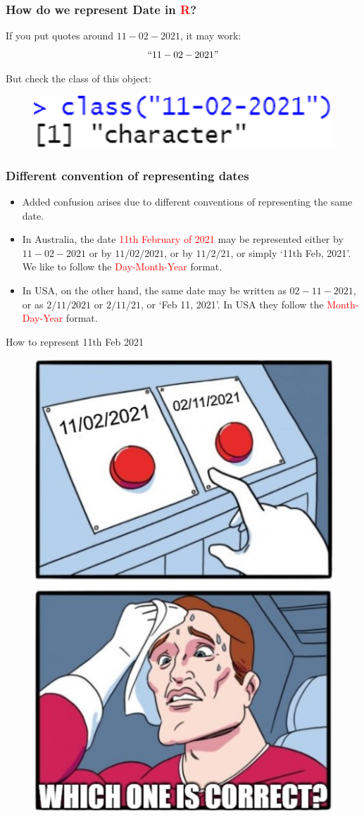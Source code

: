 \documentclass{beamer}
\begin{document}
\begin{frame}\frametitle{How do we represent Date in \textcolor{red}{\textsf{R}}?}
If you put quotes around $11-02-2021$, it may work: $$``11-02-2021"$$

But check the class of this object:
\begin{figure}
\includegraphics[width=0.70\linewidth]{PlotsLec4/DateAsChar}
\end{figure}
\end{frame}

\begin{frame}\frametitle{Different convention of representing dates}
\begin{itemize}
\item Added confusion arises due to different conventions of representing the same date.
\vspace{0.3in}
\item<2-> In Australia, the date \textcolor{red}{11th February of 2021} may be represented either by $11-02-2021$ or by $11/02/2021$, or by $11/2/21$, or simply `11th Feb, 2021'. We like to follow the \textcolor{red}{Day-Month-Year} format.
\vspace{0.3in}
\item<3-> In USA, on the other hand, the same date may be written as $02-11-2021$, or as $2/11/2021$ or $2/11/21$, or `Feb 11, 2021'. In USA they follow the \textcolor{red}{Month-Day-Year} format.
\end{itemize}
\end{frame}


\begin{frame}{How to represent 11th Feb 2021}
\begin{figure}
\includegraphics[width=0.50\linewidth]{PlotsLec4/WhichFormatCorrect}
\end{figure}
\end{frame}
\end{document}
